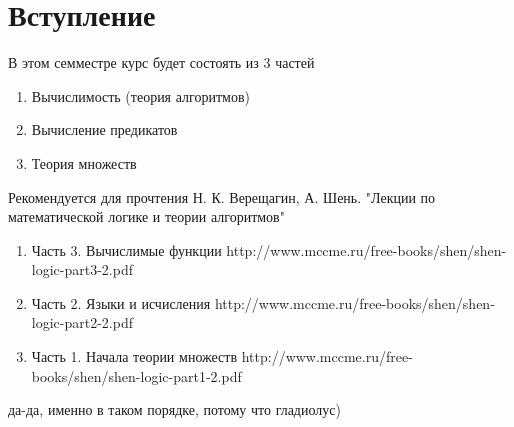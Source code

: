 \section{Вступление}
В этом семместре курс будет состоять из 3 частей
\begin{enumerate}
	\item Вычислимость (теория алгоритмов)
	\item Вычисление предикатов
	\item Теория множеств
\end{enumerate}
Рекомендуется для прочтения Н. К. Верещагин, А. Шень. "Лекции по математической логике и теории алгоритмов"
\begin{enumerate}
	\item Часть 3. Вычислимые функции 
	http://www.mccme.ru/free-books/shen/shen-logic-part3-2.pdf
	\item Часть 2. Языки и исчисления
	http://www.mccme.ru/free-books/shen/shen-logic-part2-2.pdf
	\item Часть 1. Начала теории множеств
	http://www.mccme.ru/free-books/shen/shen-logic-part1-2.pdf
\end{enumerate}
да-да, именно в таком порядке, потому что гладиолус)